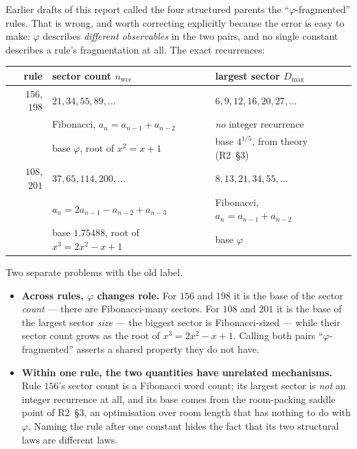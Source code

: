 \documentclass[11pt]{article}
\newcommand{\wcc}{\mathrm{wcc}}
\theoremstyle{plain}
\theoremstyle{definition}
\begin{document}
Earlier drafts of this report called the four structured parents the
``$\varphi$-fragmented'' rules. That is wrong, and worth correcting explicitly
because the error is easy to make: $\varphi$ describes \emph{different observables}
in the two pairs, and no single constant describes a rule's fragmentation at all.
The exact recurrences:

\begin{center}
\begin{tabular}{rlll}
\toprule
rule & sector count $n_\wcc$ & largest sector $D_{\max}$ \\
\midrule
$156$, $198$ & $21,34,55,89,\ldots$ & $6,9,12,16,20,27,\ldots$ \\
 & Fibonacci, $a_n=a_{n-1}+a_{n-2}$ & \emph{no} integer recurrence \\
 & base $\varphi$, root of $x^2=x+1$ & base $4^{1/5}$, from theory (R2~\S3) \\
\midrule
$108$, $201$ & $37,65,114,200,\ldots$ & $8,13,21,34,55,\ldots$ \\
 & $a_n=2a_{n-1}-a_{n-2}+a_{n-3}$ & Fibonacci, $a_n=a_{n-1}+a_{n-2}$ \\
 & base $1.75488$, root of $x^3=2x^2-x+1$ & base $\varphi$ \\
\bottomrule
\end{tabular}
\end{center}

\noindent Two separate problems with the old label.

\begin{itemize}
\item \textbf{Across rules, $\varphi$ changes role.} For $156$ and $198$ it is the
  base of the sector \emph{count} --- there are Fibonacci-many sectors. For $108$
  and $201$ it is the base of the largest sector \emph{size} --- the biggest
  sector is Fibonacci-sized --- while their sector count grows as the root of
  $x^3=2x^2-x+1$. Calling both pairs ``$\varphi$-fragmented'' asserts a shared
  property they do not have.
\item \textbf{Within one rule, the two quantities have unrelated mechanisms.}
  Rule $156$'s sector count is a Fibonacci word count; its largest sector is
  \emph{not} an integer recurrence at all, and its base comes from the
  room-packing saddle point of R2~\S3, an optimisation over room length that has
  nothing to do with $\varphi$. Naming the rule after one constant hides the fact
  that its two structural laws are different laws.
\end{itemize}
\end{document}
